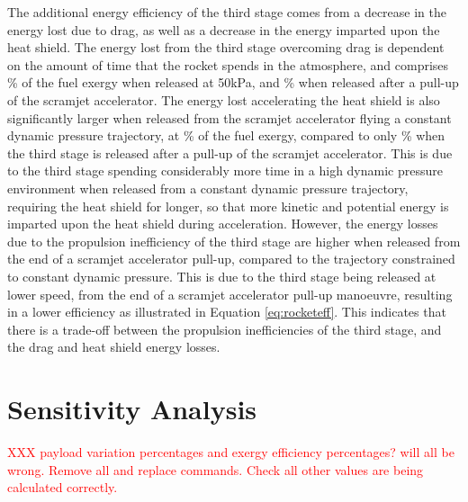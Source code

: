 The additional energy efficiency of the third stage comes from a decrease in the energy lost due to drag, as well as a decrease in the energy imparted upon the heat shield. 
The energy lost from the third stage overcoming drag is dependent on the amount of time that the rocket spends in the atmosphere, and comprises \WDthreeConstqNoReturn \% of the fuel exergy when released at 50kPa, and \WDthreeStandardNoReturn \% when released after a pull-up of the scramjet accelerator.
The energy lost accelerating the heat shield is also significantly larger when released from the scramjet accelerator flying a constant dynamic pressure trajectory, at \WHSthreeConstqNoReturn \% of the fuel exergy, compared to only \WHSthreeStandardNoReturn \% when the third stage is released after a pull-up of the scramjet accelerator. This is due to the third stage spending considerably more time in a high dynamic pressure environment when released from a constant dynamic pressure trajectory, requiring the heat shield for longer, so that more kinetic and potential energy is imparted upon the heat shield during acceleration. However, the energy losses due to the propulsion inefficiency of the third stage are higher when released from the end of a scramjet accelerator pull-up, compared to the trajectory constrained to constant dynamic pressure. This is due to the third stage being released at lower speed, from the end of a scramjet accelerator pull-up manoeuvre, resulting in a lower efficiency as illustrated in Equation \ref{eq:rocketeff}. This indicates that there is a trade-off between the propulsion inefficiencies of the third stage, and the drag and heat shield energy losses.



 

  

\section{Sensitivity Analysis}\label{sec:sensitivityNoReturn}
\textcolor{red}{XXX payload variation percentages and exergy efficiency percentages? will all be wrong. Remove all and replace commands. Check all other values are being calculated correctly.}

